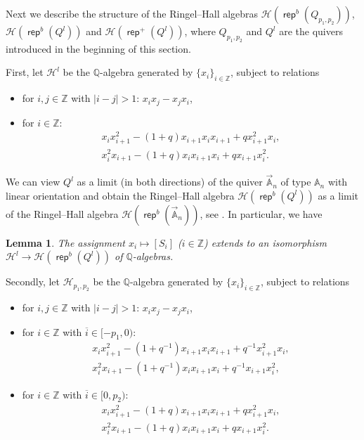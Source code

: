 \documentclass[reqno,12pt,a4paper]{amsart}
\newtheorem{lemma}[theorem]{Lemma}
\theoremstyle{remark}
\theoremstyle{definition}
\newcommand{\opname}[1]{\operatorname{\mathsf{#1}}}
\newcommand{\rep}{\opname{rep}\nolimits}
\newcommand{\ch}{{\mathcal H}}
\numberwithin{equation}{section}
\begin{document}
Next we describe the structure of the Ringel--Hall algebras $\mathcal{H}(\rep^b(Q_{p_1,p_2}))$, $\mathcal{H}(\rep^b(Q^l))$ and $\mathcal{H}(\rep^+(Q^l))$, where $Q_{p_1,p_2}$ and $Q^l$ are the quivers introduced in the beginning of this section.

First, let $\ch^{l}$ be the $\mathbb{Q}$-algebra generated by $\{x_i\}_{i\in\mathbb{Z}}$, subject to relations
\begin{itemize}
\item for $i,j\in\mathbb{Z}$ with $|i-j|>1$: $x_ix_j-x_jx_i$,
\item for $i\in\mathbb{Z}$:
\begin{gather*}
x_ix_{i+1}^2-(1+q)x_{i+1}x_ix_{i+1}+qx_{i+1}^2x_i,\\
x_i^2x_{i+1}-(1+q)x_ix_{i+1}x_i+qx_{i+1}x_i^2.
\end{gather*}
\end{itemize}

We can view $Q^l$ as a limit (in both directions) of the quiver $\overrightarrow{\mathbb{A}}_n$ of type $\mathbb{A}_n$ with linear orientation and obtain the Ringel--Hall algebra $\mathcal{H}(\rep^b(Q^l))$ as a limit of the Ringel--Hall algebra $\mathcal{H}(\rep^b(\overrightarrow{\mathbb{A}}_n))$, see \cite{HouYe2006,HouYe2008}. In particular, we have

\begin{lemma}
\label{lem:RH-algebra-of-quiver-with-linear-orientation}
The assignment $x_i\mapsto [S_i]$ ($i\in\mathbb{Z}$) extends to an isomorphism $\ch^{l}\to\ch(\rep^b(Q^l))$ of $\mathbb{Q}$-algebras.
\end{lemma}



Secondly, let $\ch_{p_1,p_2}$ be the $\mathbb{Q}$-algebra generated by $\{x_i\}_{i\in\mathbb{Z}}$, subject to relations
\begin{itemize}
\item for $i,j\in\mathbb{Z}$ with $|i-j|>1$: $x_ix_j-x_jx_i$,
\item for $i\in\mathbb{Z}$ with $\overline{i}\in[-p_1,0)$:
\begin{gather*}
x_ix_{i+1}^2-(1+q^{-1})x_{i+1}x_ix_{i+1}+q^{-1}x_{i+1}^2x_i,\\
x_i^2x_{i+1}-(1+q^{-1})x_ix_{i+1}x_i+q^{-1}x_{i+1}x_i^2,
\end{gather*}
\item for $i\in\mathbb{Z}$ with $\overline{i}\in [0,p_2)$:
\begin{gather*}
x_ix_{i+1}^2-(1+q)x_{i+1}x_ix_{i+1}+qx_{i+1}^2x_i,\\
x_i^2x_{i+1}-(1+q)x_ix_{i+1}x_i+qx_{i+1}x_i^2.
\end{gather*}
\end{itemize}
\end{document}
